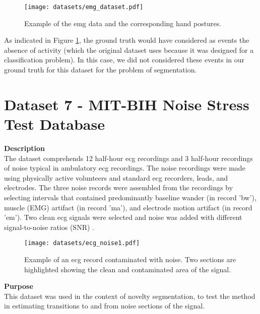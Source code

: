 \begin{figure}
\centering
\texttt{[image: datasets/emg\_dataset.pdf]}
\caption{Example of the \gls{emg} data and the corresponding hand postures.}
\label{fig:emg_dataset}
\end{figure}

As indicated in Figure \ref{fig:emg_dataset}, the ground truth would have considered as events the absence of activity (which the original dataset uses because it was designed for a classification problem). In this case, we did not considered these events in our ground truth for this dataset for the problem of segmentation.    

%

\section{Dataset 7 - MIT-BIH Noise Stress Test Database}
\label{dat:dataset7}
\textbf{Description}\hfill\\
The dataset comprehends 12 half-hour \gls{ecg} recordings and 3 half-hour recordings of noise typical in ambulatory \gls{ecg} recordings. The noise recordings were made using physically active volunteers and standard \gls{ecg} recorders, leads, and electrodes. The three noise records were assembled from the recordings by selecting intervals that contained predominantly baseline wander (in record 'bw'), muscle (EMG) artifact (in record 'ma'), and electrode motion artifact (in record 'em'). Two clean \gls{ecg} signals were selected and noise was added with different signal-to-noise ratios (SNR) \cite{dataset6, PhysioNet}.\\

\begin{figure}
\centering
\texttt{[image: datasets/ecg\_noise1.pdf]}
\caption{Example of an \gls{ecg} record contaminated with noise. Two sections are highlighted showing the clean and contaminated area of the signal. \cite{dataset7}}
\label{fig:ecg1_dataset}
\end{figure}

\textbf{Purpose}\hfill\\
This dataset was used in the context of novelty segmentation, to test the method in estimating transitions to and from noise sections of the signal.
    
